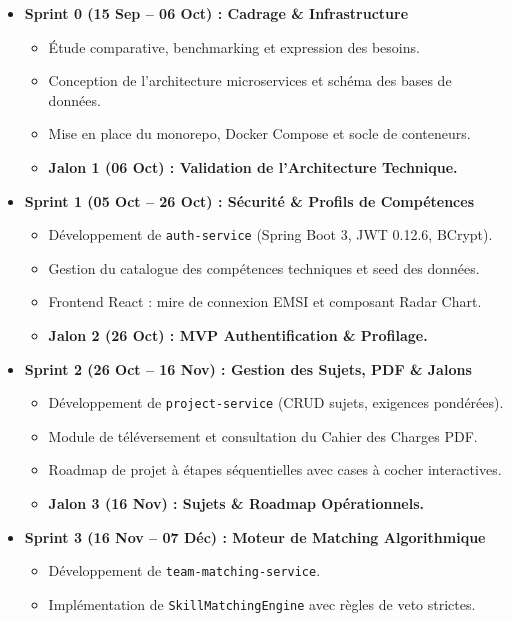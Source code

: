 \documentclass[11pt,a4paper,titlepage]{article}
\begin{document}
\begin{itemize}[leftmargin=1.5cm]
    \item \textbf{Sprint 0 (15 Sep -- 06 Oct) : Cadrage \& Infrastructure}
    \begin{itemize}
        \item Étude comparative, benchmarking et expression des besoins.
        \item Conception de l'architecture microservices et schéma des bases de données.
        \item Mise en place du monorepo, Docker Compose et socle de conteneurs.
        \item \textbf{Jalon 1 (06 Oct) : Validation de l'Architecture Technique.}
    \end{itemize}
    \item \textbf{Sprint 1 (05 Oct -- 26 Oct) : Sécurité \& Profils de Compétences}
    \begin{itemize}
        \item Développement de \texttt{auth-service} (Spring Boot 3, JWT 0.12.6, BCrypt).
        \item Gestion du catalogue des compétences techniques et seed des données.
        \item Frontend React : mire de connexion EMSI et composant Radar Chart.
        \item \textbf{Jalon 2 (26 Oct) : MVP Authentification \& Profilage.}
    \end{itemize}
    \item \textbf{Sprint 2 (26 Oct -- 16 Nov) : Gestion des Sujets, PDF \& Jalons}
    \begin{itemize}
        \item Développement de \texttt{project-service} (CRUD sujets, exigences pondérées).
        \item Module de téléversement et consultation du Cahier des Charges PDF.
        \item Roadmap de projet à étapes séquentielles avec cases à cocher interactives.
        \item \textbf{Jalon 3 (16 Nov) : Sujets \& Roadmap Opérationnels.}
    \end{itemize}
    \item \textbf{Sprint 3 (16 Nov -- 07 Déc) : Moteur de Matching Algorithmique}
    \begin{itemize}
        \item Développement de \texttt{team-matching-service}.
        \item Implémentation de \texttt{SkillMatchingEngine} avec règles de veto strictes.

\end{itemize}
\end{itemize}
\end{document}
